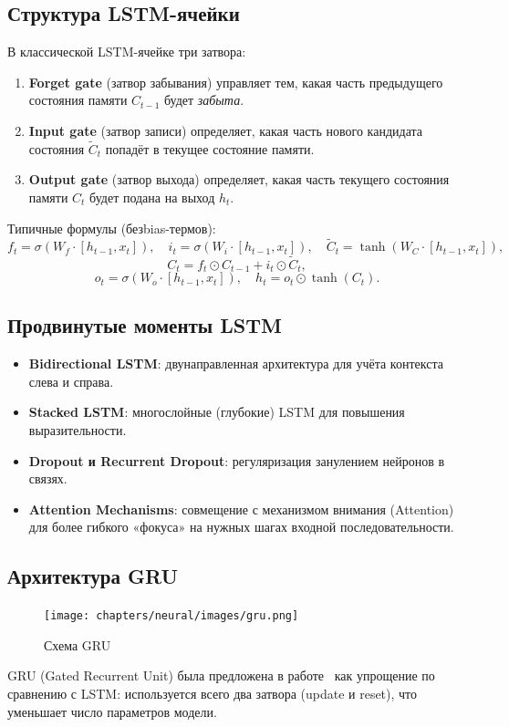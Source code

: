 \subsection{Структура LSTM-ячейки}
В классической LSTM-ячейке три затвора:
\begin{enumerate}
    \item \textbf{Forget gate} (затвор забывания) управляет тем, какая часть предыдущего состояния памяти $C_{t-1}$ будет \textit{забыта}.
    \item \textbf{Input gate} (затвор записи) определяет, какая часть нового кандидата состояния $\tilde{C}_t$ попадёт в текущее состояние памяти.
    \item \textbf{Output gate} (затвор выхода) определяет, какая часть текущего состояния памяти $C_t$ будет подана на выход $h_t$.
\end{enumerate}

Типичные формулы (безbias-термов):
\[
f_t = \sigma(W_f \cdot [h_{t-1}, x_t]), \quad
i_t = \sigma(W_i \cdot [h_{t-1}, x_t]), \quad
\tilde{C}_t = \tanh(W_C \cdot [h_{t-1}, x_t]),
\]
\[
C_t = f_t \odot C_{t-1} + i_t \odot \tilde{C}_t,
\]
\[
o_t = \sigma(W_o \cdot [h_{t-1}, x_t]), \quad
h_t = o_t \odot \tanh(C_t).
\]

\subsection{Продвинутые моменты LSTM}
\begin{itemize}
    \item \textbf{Bidirectional LSTM}: двунаправленная архитектура для учёта контекста слева и справа.
    \item \textbf{Stacked LSTM}: многослойные (глубокие) LSTM для повышения выразительности.
    \item \textbf{Dropout и Recurrent Dropout}: регуляризация занулением нейронов в связях.
    \item \textbf{Attention Mechanisms}: совмещение с механизмом внимания (Attention) для более гибкого «фокуса» на нужных шагах входной последовательности.
\end{itemize}

\subsection{Архитектура GRU}

\begin{figure}[h]
	\centering
	\texttt{[image: chapters/neural/images/gru.png]}
	\caption{Схема GRU}
	\label{img:gru}
\end{figure}
GRU (Gated Recurrent Unit) была предложена в работе~\cite{cho2014properties} как упрощение по сравнению с LSTM: используется всего два затвора (update и reset), что уменьшает число параметров модели.

